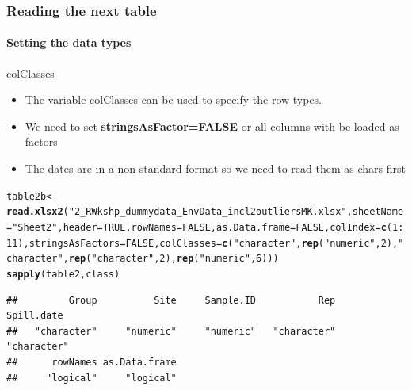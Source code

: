 \documentclass[10pt,handout,english]{beamer}\usepackage[]{graphicx}\usepackage[]{color}
\makeatletter
\newcommand{\hlnum}[1]{\textcolor[rgb]{0.686,0.059,0.569}{#1}}%
\newcommand{\hlstr}[1]{\textcolor[rgb]{0.192,0.494,0.8}{#1}}%
\newcommand{\hlopt}[1]{\textcolor[rgb]{0,0,0}{#1}}%
\newcommand{\hlstd}[1]{\textcolor[rgb]{0.345,0.345,0.345}{#1}}%
\newcommand{\hlkwb}[1]{\textcolor[rgb]{0.69,0.353,0.396}{#1}}%
\newcommand{\hlkwc}[1]{\textcolor[rgb]{0.333,0.667,0.333}{#1}}%
\newcommand{\hlkwd}[1]{\textcolor[rgb]{0.737,0.353,0.396}{\textbf{#1}}}%
\newenvironment{kframe}{%
 \def\at@end@of@kframe{}%
 \ifinner\ifhmode%
  \def\at@end@of@kframe{\end{minipage}}%
  \begin{minipage}{\columnwidth}%
 \fi\fi%
 \def\FrameCommand##1{\hskip\@totalleftmargin \hskip-\fboxsep
 \colorbox{shadecolor}{##1}\hskip-\fboxsep
     \hskip-\linewidth \hskip-\@totalleftmargin \hskip\columnwidth}%
 \MakeFramed {\advance\hsize-\width
   \@totalleftmargin\z@ \linewidth\hsize
   \@setminipage}}%
 {\par\unskip\endMakeFramed%
 \at@end@of@kframe}
\newenvironment{knitrout}{}{} %
\makeatother
\begin{document}
\begin{frame}[fragile]
  \frametitle{Reading the next table}
  \framesubtitle{Setting the data types}
\begin{block}{colClasses}
\begin{itemize}
\item The variable colClasses can be used to specify the row types.
\item We need to set {\bf stringsAsFactor=FALSE} or all columns with be loaded as factors
\item The dates are in a non-standard format so we need to read them as chars first
\end{itemize}
\end{block}

\begin{knitrout}
\color{fgcolor}\begin{kframe}
\begin{alltt}
\hlstd{table2b}\hlkwb{<-}\hlkwd{read.xlsx2}\hlstd{(}\hlstr{"2_R Wkshp_dummy data_Env Data_incl2outliersMK.xlsx"}\hlstd{,} \hlkwc{sheetName} \hlstd{=} \hlstr{"Sheet2"}\hlstd{,}\hlkwc{header}\hlstd{=}\hlnum{TRUE}\hlstd{,}\hlkwc{rowNames}\hlstd{=}\hlnum{FALSE}\hlstd{,}\hlkwc{as.Data.frame}\hlstd{=}\hlnum{FALSE}\hlstd{,}\hlkwc{colIndex}\hlstd{=}\hlkwd{c}\hlstd{(}\hlnum{1}\hlopt{:}\hlnum{11}\hlstd{),}\hlkwc{stringsAsFactors}\hlstd{=}\hlnum{FALSE}\hlstd{,}\hlkwc{colClasses}\hlstd{=}\hlkwd{c}\hlstd{(}\hlstr{"character"}\hlstd{,}\hlkwd{rep}\hlstd{(}\hlstr{"numeric"}\hlstd{,}\hlnum{2}\hlstd{),}\hlstr{"character"}\hlstd{,}\hlkwd{rep}\hlstd{(}\hlstr{"character"}\hlstd{,}\hlnum{2}\hlstd{),}\hlkwd{rep}\hlstd{(}\hlstr{"numeric"}\hlstd{,}\hlnum{6}\hlstd{)))}
\hlkwd{sapply}\hlstd{(table2,class)}
\end{alltt}
\begin{verbatim}
##         Group          Site     Sample.ID           Rep    Spill.date 
##   "character"     "numeric"     "numeric"   "character"   "character" 
##      rowNames as.Data.frame 
##     "logical"     "logical"
\end{verbatim}
\end{kframe}
\end{knitrout}
\clearpage
\end{frame}
\end{document}
